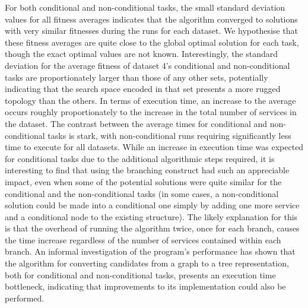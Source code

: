 \documentclass[conference]{IEEEtran}
\begin{document}
For both conditional and non-conditional tasks, the small standard deviation values for all fitness averages indicates that the algorithm converged to solutions with very similar fitnesses during the runs for each dataset. We hypothesise that these fitness averages are quite close to the global optimal solution for each task, though the exact optimal values are not known. Interestingly, the standard deviation for the average fitness of dataset 4's  conditional and non-conditional tasks are proportionately larger than those of any other sets, potentially indicating that the search space encoded in that set presents a more rugged topology than the others. In terms of execution time, an increase to the average occurs roughly proportionately to the increase in the total number of services in the dataset. The contrast between the average times for conditional and non-conditional tasks is stark, with non-conditional runs requiring significantly less time to execute for all datasets. While an increase in execution time was expected for conditional tasks due to the additional algorithmic steps required, it is interesting to find that using the branching construct had such an appreciable impact, even when some of the potential solutions were quite similar for the conditional and the non-conditional tasks (in some cases, a non-conditional solution could be made into a conditional one simply by adding one more service and a conditional node to the existing structure). The likely explanation for this is that the overhead of running the algorithm twice, once for each branch, causes the time increase regardless of the number of services contained within each branch. An informal investigation of the program's performance has shown that the algorithm for converting candidates from a graph to a tree representation, both for conditional and non-conditional tasks, presents an execution time bottleneck, indicating that improvements to its implementation could also be performed.
\end{document}
